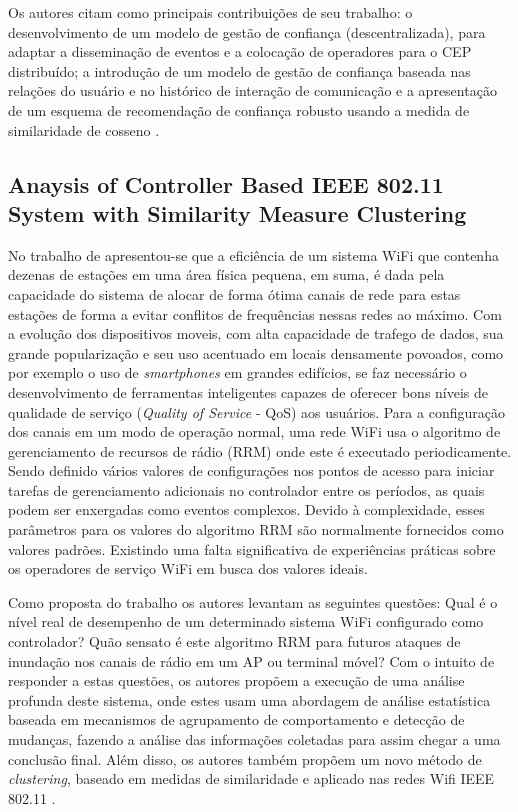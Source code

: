 \documentclass[ti,table]{texufpel} %
\begin{document}
    Os autores citam como principais contribuições de seu trabalho: o desenvolvimento de um modelo de gestão de confiança (descentralizada), para adaptar a disseminação de eventos e a colocação de operadores para o CEP distribuído; a introdução de um modelo de gestão de confiança baseada nas relações do usuário e no histórico de interação de comunicação e a apresentação de um esquema de recomendação de confiança robusto usando a medida de similaridade de cosseno \cite{art6dwarakanath2017trustcep}. 

     

  

  

\subsection{Anaysis of Controller Based IEEE 802.11 System with Similarity Measure Clustering} 

  

  

    No trabalho de \cite{art7gal2017anaysis} apresentou-se que a eficiência de um sistema WiFi que contenha dezenas de estações em uma área física pequena, em suma, é dada pela capacidade do sistema de alocar de forma ótima canais de rede para estas estações de forma a evitar conflitos de frequências nessas redes ao máximo. Com a evolução dos dispositivos moveis, com alta capacidade de trafego de dados, sua grande popularização e seu uso acentuado em locais densamente povoados, como por exemplo o uso de \textit{smartphones} em grandes edifícios, se faz necessário o desenvolvimento de ferramentas inteligentes capazes de oferecer bons níveis de qualidade de serviço (\textit{Quality of Service} - QoS) aos usuários. Para a configuração dos canais em um modo de operação normal, uma rede WiFi usa o algoritmo de gerenciamento de recursos de rádio (RRM) onde este é executado periodicamente. Sendo definido vários valores de configurações nos pontos de acesso para iniciar tarefas de gerenciamento adicionais no controlador entre os períodos, as quais podem ser enxergadas como eventos complexos. Devido à complexidade, esses parâmetros para os valores do algoritmo RRM são normalmente fornecidos como valores padrões. Existindo uma falta significativa de experiências práticas sobre os operadores de serviço WiFi em busca dos valores ideais. 

     

     Como proposta do trabalho os autores levantam as seguintes questões: Qual é o nível real de desempenho de um determinado sistema WiFi configurado como controlador? Quão sensato é este algoritmo RRM para futuros ataques de inundação nos canais de rádio em um AP ou terminal móvel? Com o intuito de responder a estas questões, os autores propõem a execução de uma análise profunda deste sistema, onde estes usam uma abordagem de análise estatística baseada em mecanismos de agrupamento de comportamento e detecção de mudanças, fazendo a análise das informações coletadas para assim chegar a uma conclusão final. Além disso, os autores também propõem um novo método de \textit{clustering}, baseado em medidas de similaridade e aplicado nas redes Wifi IEEE 802.11 \cite{art7gal2017anaysis}.         
\end{document}
